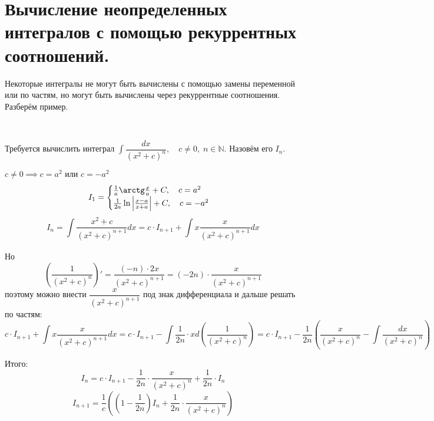 \documentclass[../main.tex]{subfiles}
\begin{document}
\newpage
\section{Вычисление неопределенных интегралов с помощью рекуррентных соотношений.}
Некоторые интегралы не могут быть вычислены с помощью замены переменной или по частям, но могут быть вычислены через рекуррентные соотношения. 
Разберём пример. 
\begin{example}
    
    ~

    Требуется вычислить интеграл \( \displaystyle\int\limits_{ }^{ } \dfrac{ dx}{ \left( x^2+c\right)^n},\quad c \neq 0,\; n \in \mathbb{N} \). Назовём его \( I_n\).

    \( c \neq 0 \implies c=a^2\text{ или }c=-a^2\)
    \begin{equation*}
        I_1=
        \begin{cases}
            \frac{ 1}{ a} \arctg \frac{ x}{ a} +C,\quad c=a^2\\
            \frac{ 1}{ 2a} \ln \left| \frac{ x-a}{ x+a} \right|+C,\quad c=-a^2
        \end{cases}
    \end{equation*}
    \[ I_n= \displaystyle\int\limits_{ }^{ } \dfrac{ x^2+c}{ \left( x^2+c\right)^{n+1}} dx=c \cdot I_{n+1}+ \displaystyle\int\limits_{ }^{ } x \dfrac{ x}{ \left( x^2+c\right)^{n+1}} dx\]

    Но 
    \[ \left(\dfrac{ 1}{ \left( x^2+c\right)^{n}}\right)'= \dfrac{ (-n)\cdot2x}{ \left( x^2+c\right)^{n+1}}=\left( -2n\right) \cdot  \dfrac{ x}{ \left( x^2+c\right)^{n+1}}\]
    поэтому можно внести \( \dfrac{ x}{ \left( x^2+c\right)^{n+1}}\) под знак дифференциала и дальше решать по частям:
    \[ c \cdot I_{n+1}+ \displaystyle\int\limits_{ }^{ } x \dfrac{ x}{ \left( x^2+c\right)^{n+1}} dx=c \cdot I_{n+1}- \displaystyle\int\limits_{ }^{ } \dfrac{ 1}{ 2n} \cdot xd\left( \dfrac{ 1}{ \left( x^2+c\right)^{n}} \right) =c \cdot I_{n+1}- \dfrac{ 1}{ 2n} \left( \dfrac{ x}{ \left( x^2+c\right)^n} - \displaystyle\int\limits_{ }^{ } \dfrac{ dx}{ \left( x^2+c\right)^n} \right)\]

    Итого:
    \[ I_n=c \cdot I_{n+1}- \dfrac{ 1}{ 2n} \cdot \dfrac{ x}{ \left( x^2+c\right)^n} + \dfrac{ 1}{ 2n} \cdot I_n\]
    \[ \boxed{I_{n+1}= \dfrac{ 1}{ c} \left( \left( 1- \dfrac{ 1}{ 2n} \right)I_n + \dfrac{ 1}{ 2n} \cdot \dfrac{ x}{ \left( x^2+c\right)^n} \right)}\]
\end{example}
\end{document}
